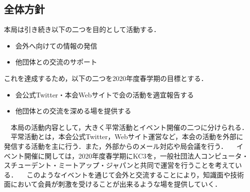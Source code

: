 \subsection*{全体方針}


本局は引き続き以下の二つを目的として活動する．
\begin{itemize}
    \item 会外へ向けての情報の発信
    \item 他団体との交流のサポート
\end{itemize}
これを達成するため，以下の二つを2020年度春学期の目標とする．
\begin{itemize}
    \item 会公式Twitter・本会Webサイトで会の活動を適宜報告する
    \item 他団体との交流を深める場を提供する
\end{itemize}
　本局の活動内容として，大きく平常活動とイベント開催の二つに分けられる．
　平常活動とは，本会公式Twitter，Webサイト運営など，本会の活動を外部に発信する活動を主に行う．また，外部からのメール対応や局会議を行う．
　イベント開催に関しては，2020年度春学期にKC3を，一般社団法人コンピュータ・スチューデント・ミートアップ・ジャパンと共同で運営を行うことを考えている．
　このようなイベントを通じて会外と交流することにより，知識面や技術面において会員が刺激を受けることが出来るような場を提供していく．
